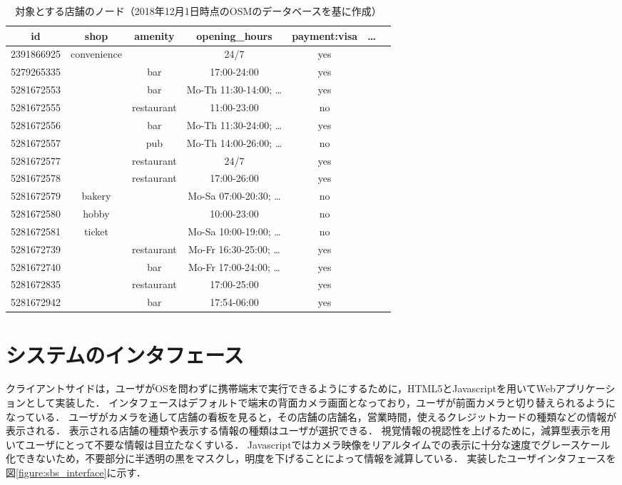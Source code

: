 \begin{table}[tb]
    \caption{対象とする店舗のノード（2018年12月1日時点のOSMのデータベースを基に作成）}
    \label{table:storelist}
    \begin{center}
      \begin{tabular}{c|cccccc}
        \hline\hline
        id & shop & amenity & opening\_hours & payment:visa & \ldots \\ 
        \hline
        2391866925 & convenience & & 24/7 & yes & \\
        5279265335 & & bar & 17:00-24:00 & yes & \\
        5281672553 & & bar & Mo-Th 11:30-14:00; \ldots & yes & \\
        5281672555 & & restaurant & 11:00-23:00 & no & \\
        5281672556 & & bar & Mo-Th 11:30-24:00; \ldots & yes & \\
        5281672557 & & pub & Mo-Th 14:00-26:00; \ldots & no & \\
        5281672577 & & restaurant & 24/7 & yes & \\
        5281672578 & & restaurant & 17:00-26:00 & yes & \\
        5281672579 & bakery & & Mo-Sa 07:00-20:30; \ldots & no & \\
        5281672580 & hobby & & 10:00-23:00 & no & \\
        5281672581 & ticket & & Mo-Sa 10:00-19:00; \ldots & no & \\
        5281672739 & & restaurant & Mo-Fr 16:30-25:00; \ldots & yes & \\
        5281672740 & & bar & Mo-Fr 17:00-24:00; \ldots & yes & \\
        5281672835 & & restaurant & 17:00-25:00 & yes & \\
        5281672942 & & bar & 17:54-06:00 & yes & \\
        \hline
      \end{tabular}
    \end{center}


  \end{table}


\section{システムのインタフェース}
  クライアントサイドは，ユーザがOSを問わずに携帯端末で実行できるようにするために，HTML5とJavascriptを用いてWebアプリケーションとして実装した．
  インタフェースはデフォルトで端末の背面カメラ画面となっており，ユーザが前面カメラと切り替えられるようになっている．
  ユーザがカメラを通して店舗の看板を見ると，その店舗の店舗名，営業時間，使えるクレジットカードの種類などの情報が表示される．
  表示される店舗の種類や表示する情報の種類はユーザが選択できる．
  視覚情報の視認性を上げるために，減算型表示を用いてユーザにとって不要な情報は目立たなくすいる．
  Javascriptではカメラ映像をリアルタイムでの表示に十分な速度でグレースケール化できないため，不要部分に半透明の黒をマスクし，明度を下げることによって情報を減算している．
  実装したユーザインタフェースを図\ref{figure:sbs_interface}に示す．

